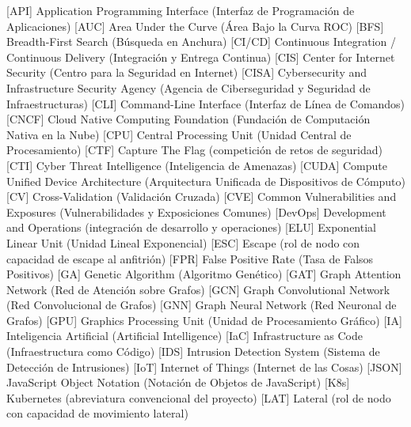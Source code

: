 \begin{acronym}[SMOTE]
    [API]   {Application Programming Interface (Interfaz de Programación de Aplicaciones)}
    [AUC]   {Area Under the Curve (Área Bajo la Curva ROC)}
    [BFS]   {Breadth-First Search (Búsqueda en Anchura)}
   [CI/CD] {Continuous Integration / Continuous Delivery (Integración y Entrega Continua)}
    [CIS]   {Center for Internet Security (Centro para la Seguridad en Internet)}
   [CISA]  {Cybersecurity and Infrastructure Security Agency (Agencia de Ciberseguridad y Seguridad de Infraestructuras)}
    [CLI]   {Command-Line Interface (Interfaz de Línea de Comandos)}
   [CNCF]  {Cloud Native Computing Foundation (Fundación de Computación Nativa en la Nube)}
    [CPU]   {Central Processing Unit (Unidad Central de Procesamiento)}
               [CTF]       {Capture The Flag (competición de retos de seguridad)}
    [CTI]   {Cyber Threat Intelligence (Inteligencia de Amenazas)}
   [CUDA]  {Compute Unified Device Architecture (Arquitectura Unificada de Dispositivos de Cómputo)}
     [CV]    {Cross-Validation (Validación Cruzada)}
    [CVE]   {Common Vulnerabilities and Exposures (Vulnerabilidades y Exposiciones Comunes)}
               [DevOps]       {Development and Operations (integración de desarrollo y operaciones)}
    [ELU]   {Exponential Linear Unit (Unidad Lineal Exponencial)}
               [ESC]       {Escape (rol de nodo con capacidad de escape al anfitrión)}
    [FPR]   {False Positive Rate (Tasa de Falsos Positivos)}
     [GA]    {Genetic Algorithm (Algoritmo Genético)}
    [GAT]   {Graph Attention Network (Red de Atención sobre Grafos)}
    [GCN]   {Graph Convolutional Network (Red Convolucional de Grafos)}
    [GNN]   {Graph Neural Network (Red Neuronal de Grafos)}
    [GPU]   {Graphics Processing Unit (Unidad de Procesamiento Gráfico)}
     [IA]    {Inteligencia Artificial (Artificial Intelligence)}
    [IaC]   {Infrastructure as Code (Infraestructura como Código)}
    [IDS]   {Intrusion Detection System (Sistema de Detección de Intrusiones)}
    [IoT]   {Internet of Things (Internet de las Cosas)}
   [JSON]  {JavaScript Object Notation (Notación de Objetos de JavaScript)}
               [K8s]       {Kubernetes (abreviatura convencional del proyecto)}
               [LAT]       {Lateral (rol de nodo con capacidad de movimiento lateral)}

\end{acronym}
